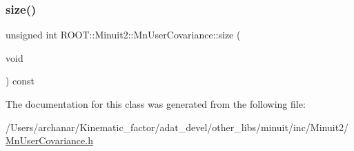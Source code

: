 \subsubsection{\texorpdfstring{size()}{size()}\hspace{0.1cm}{\footnotesize\ttfamily [2/2]}}
{\footnotesize\ttfamily unsigned int R\+O\+O\+T\+::\+Minuit2\+::\+Mn\+User\+Covariance\+::size (\begin{DoxyParamCaption}\item[{void}]{ }\end{DoxyParamCaption}) const\hspace{0.3cm}{\ttfamily [inline]}}



The documentation for this class was generated from the following file\+:\begin{DoxyCompactItemize}
\item 
/\+Users/archanar/\+Kinematic\+\_\+factor/adat\+\_\+devel/other\+\_\+libs/minuit/inc/\+Minuit2/\mbox{\hyperlink{other__libs_2minuit_2inc_2Minuit2_2MnUserCovariance_8h}{Mn\+User\+Covariance.\+h}}\end{DoxyCompactItemize}
